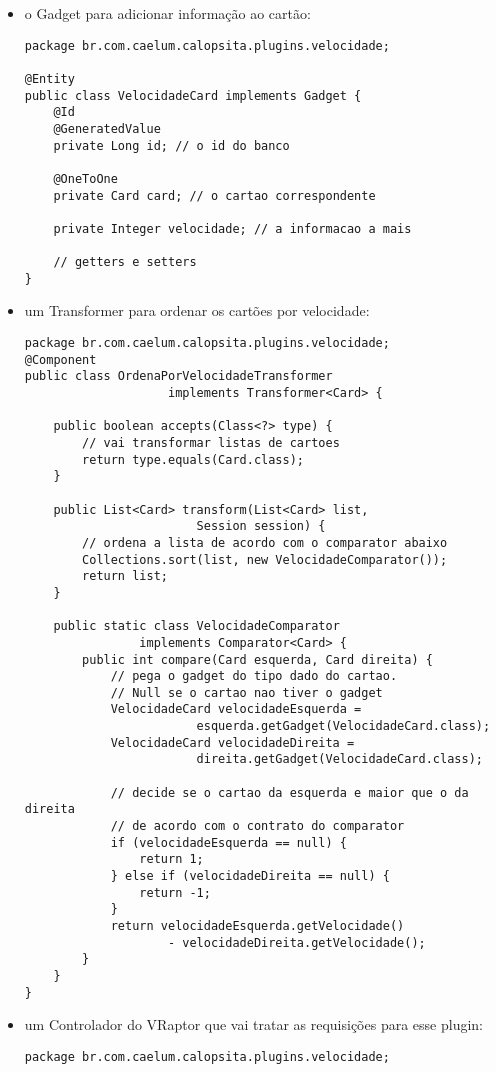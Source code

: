 \begin{itemize}
	\item{o Gadget para adicionar informação ao cartão:
		\begin{lstlisting}
package br.com.caelum.calopsita.plugins.velocidade;

@Entity
public class VelocidadeCard implements Gadget {
	@Id
	@GeneratedValue
	private Long id; // o id do banco
	
	@OneToOne
	private Card card; // o cartao correspondente
	
	private Integer velocidade; // a informacao a mais
	
	// getters e setters
}
		\end{lstlisting}	
	}
	\item{um Transformer para ordenar os cartões por velocidade:
		\begin{lstlisting}
package br.com.caelum.calopsita.plugins.velocidade;
@Component
public class OrdenaPorVelocidadeTransformer 
					implements Transformer<Card> {

	public boolean accepts(Class<?> type) {
		// vai transformar listas de cartoes
		return type.equals(Card.class); 
	}

	public List<Card> transform(List<Card> list, 
						Session session) {
		// ordena a lista de acordo com o comparator abaixo
		Collections.sort(list, new VelocidadeComparator()); 
		return list;
	}

	public static class VelocidadeComparator 
				implements Comparator<Card> {
		public int compare(Card esquerda, Card direita) {
			// pega o gadget do tipo dado do cartao. 
			// Null se o cartao nao tiver o gadget
			VelocidadeCard velocidadeEsquerda = 
						esquerda.getGadget(VelocidadeCard.class); 
			VelocidadeCard velocidadeDireita = 
						direita.getGadget(VelocidadeCard.class);
			
			// decide se o cartao da esquerda e maior que o da direita
			// de acordo com o contrato do comparator
			if (velocidadeEsquerda == null) {
				return 1;
			} else if (velocidadeDireita == null) {
				return -1;
			}
			return velocidadeEsquerda.getVelocidade() 
					- velocidadeDireita.getVelocidade();
		}
	}
}

		\end{lstlisting}
	}
	
	\item{um Controlador do VRaptor que vai tratar as requisições para esse plugin:
	
		\begin{lstlisting}
package br.com.caelum.calopsita.plugins.velocidade;


\end{lstlisting}}
\end{itemize}
